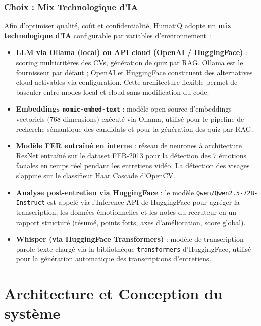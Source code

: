 \subsubsection{Choix : Mix Technologique d'IA}
Afin d'optimiser qualité, coût et confidentialité, HumatiQ adopte un \textbf{mix technologique d'IA} configurable par variables d'environnement :
\begin{itemize}
    \item \textbf{LLM via Ollama (local) ou API cloud (OpenAI / HuggingFace)} : scoring multicritères des CVs, génération de quiz par RAG. Ollama est le fournisseur par défaut ; OpenAI et HuggingFace constituent des alternatives cloud activables via configuration. Cette architecture flexible permet de basculer entre modes local et cloud sans modification du code.
    \item \textbf{Embeddings \texttt{nomic-embed-text}} : modèle open-source d'embeddings vectoriels (768 dimensions) exécuté via Ollama, utilisé pour le pipeline de recherche sémantique des candidats et pour la génération des quiz par RAG.
    \item \textbf{Modèle FER entraîné en interne} : réseau de neurones à architecture ResNet entraîné sur le dataset FER-2013 pour la détection des 7 émotions faciales en temps réel pendant les entretiens vidéo. La détection des visages s'appuie sur le classifieur Haar Cascade d'OpenCV.
    \item \textbf{Analyse post-entretien via HuggingFace} : le modèle \texttt{Qwen/Qwen2.5-72B-Instruct} est appelé via l'Inference API de HuggingFace pour agréger la transcription, les données émotionnelles et les notes du recruteur en un rapport structuré (résumé, points forts, axes d'amélioration, score global).
    \item \textbf{Whisper (via HuggingFace Transformers)} : modèle de transcription parole-texte chargé via la bibliothèque \texttt{transformers} d'HuggingFace, utilisé pour la génération automatique des transcriptions d'entretiens.
\end{itemize}
\section{Architecture et Conception du système}
